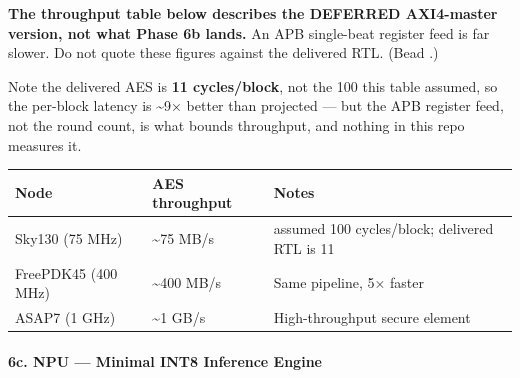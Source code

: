 \begin{record}
\warn{} \textbf{The throughput table below describes the DEFERRED
AXI4-master version, not what Phase 6b lands.} An APB single-beat
register feed is far slower. Do not quote these figures against the
delivered RTL. (Bead .)

Note the delivered AES is \textbf{11 cycles/\allowbreak{}block}, not the
100 this table assumed, so the per-block latency is \textasciitilde9×
better than projected --- but the APB register feed, not the round
count, is what bounds throughput, and nothing in this repo measures it.

{
\begin{longtable}[]{@{}
  >{\raggedright\arraybackslash}p{}
  >{\raggedright\arraybackslash}p{}
  >{\raggedright\arraybackslash}p{}@{}}
\toprule\noalign{}
\begin{minipage}[b]{\linewidth}\raggedright
Node
\end{minipage} & \begin{minipage}[b]{\linewidth}\raggedright
AES throughput
\end{minipage} & \begin{minipage}[b]{\linewidth}\raggedright
Notes
\end{minipage} \\
\midrule\noalign{}
\endhead
\bottomrule\noalign{}
\endlastfoot
Sky130 (75 MHz) & \textasciitilde75 MB/s & assumed 100
cycles/\allowbreak{}block; delivered RTL is 11 \\
FreePDK45 (400 MHz) & \textasciitilde400 MB/s & Same pipeline, 5×
faster \\
ASAP7 (1 GHz) & \textasciitilde1 GB/s & High-throughput secure
element \\
\end{longtable}
}

\end{record}

\paragraph{6c. NPU --- Minimal INT8 Inference Engine}\label{cr:status:roadmap:6c-npu-minimal-int8-inference-engine}

